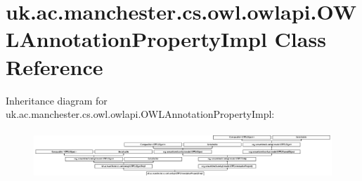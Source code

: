 \hypertarget{classuk_1_1ac_1_1manchester_1_1cs_1_1owl_1_1owlapi_1_1_o_w_l_annotation_property_impl}{\section{uk.\-ac.\-manchester.\-cs.\-owl.\-owlapi.\-O\-W\-L\-Annotation\-Property\-Impl Class Reference}
\label{classuk_1_1ac_1_1manchester_1_1cs_1_1owl_1_1owlapi_1_1_o_w_l_annotation_property_impl}
}
Inheritance diagram for uk.\-ac.\-manchester.\-cs.\-owl.\-owlapi.\-O\-W\-L\-Annotation\-Property\-Impl\-:\begin{figure}[H]
\begin{center}
\leavevmode
\includegraphics[height=1.851240cm]{classuk_1_1ac_1_1manchester_1_1cs_1_1owl_1_1owlapi_1_1_o_w_l_annotation_property_impl}
\end{center}
\end{figure}
